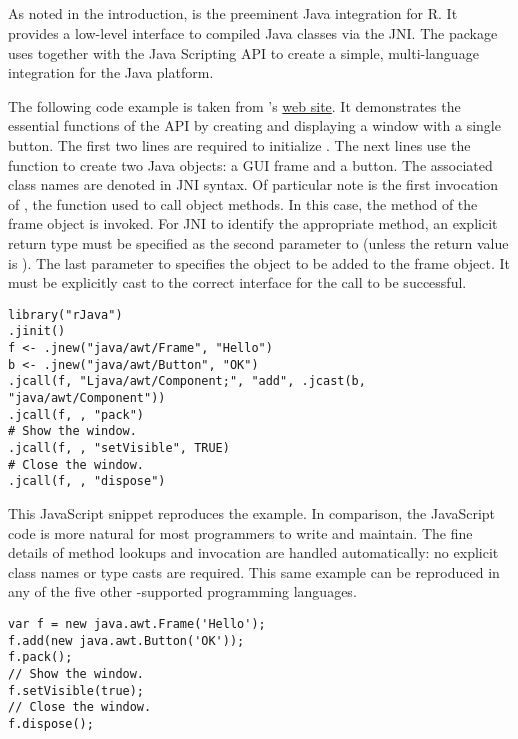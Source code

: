 \subsection{}

As noted in the introduction,  is the preeminent Java integration for R. It provides a low-level interface to compiled Java classes via the JNI. The  package uses  together with the Java Scripting API to create a simple, multi-language integration for the Java platform.

The following code example is taken from 's \href{http://www.rforge.net/rJava/}{web site}. It demonstrates the essential functions of the  API by creating and displaying a window with a single button. The first two lines are required to initialize . The next lines use the  function to create two Java objects: a GUI frame and a button. The associated class names are denoted in JNI syntax. Of particular note is the first invocation of , the function used to call object methods. In this case, the  method of the frame object is invoked. For JNI to identify the appropriate method, an explicit return type must be specified as the second parameter to  (unless the return value is ). The last parameter to  specifies the object to be added to the frame object. It must be explicitly cast to the correct interface for the call to be successful.

\begin{verbatim}
library("rJava")
.jinit()
f <- .jnew("java/awt/Frame", "Hello")
b <- .jnew("java/awt/Button", "OK")
.jcall(f, "Ljava/awt/Component;", "add", .jcast(b, "java/awt/Component"))
.jcall(f, , "pack")
# Show the window.
.jcall(f, , "setVisible", TRUE)
# Close the window.
.jcall(f, , "dispose")
\end{verbatim}

This JavaScript snippet reproduces the  example. In comparison, the JavaScript code is more natural for most programmers to write and maintain. The fine details of method lookups and invocation are handled automatically: no explicit class names or type casts are required. This same example can be reproduced in any of the five other -supported programming languages.

\begin{verbatim}
var f = new java.awt.Frame('Hello');
f.add(new java.awt.Button('OK'));
f.pack();
// Show the window.
f.setVisible(true);
// Close the window.
f.dispose();
\end{verbatim}

